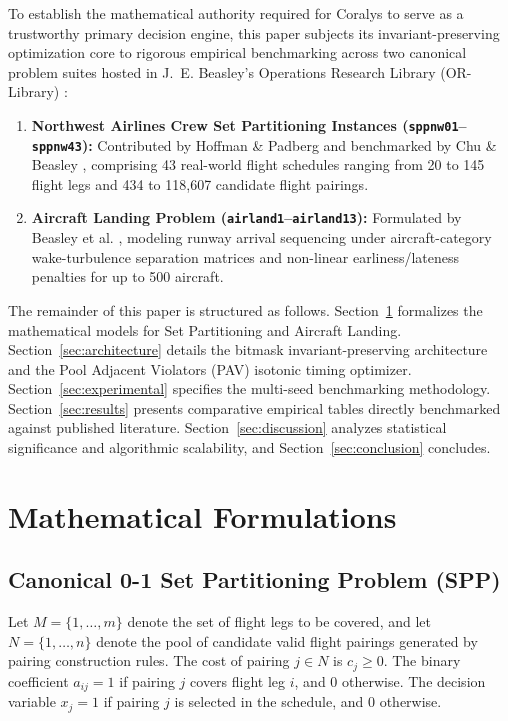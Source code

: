 \documentclass[10pt,journal,compsoc]{IEEEtran}
\begin{document}
To establish the mathematical authority required for Coralys to serve as a trustworthy primary decision engine, this paper subjects its invariant-preserving optimization core to rigorous empirical benchmarking across two canonical problem suites hosted in J.~E. Beasley's Operations Research Library (OR-Library) \cite{beasley1990orlib}:
\begin{enumerate}
    \item \textbf{Northwest Airlines Crew Set Partitioning Instances (\texttt{sppnw01}--\texttt{sppnw43}):} Contributed by Hoffman \& Padberg \cite{hoffman1993solving} and benchmarked by Chu \& Beasley \cite{chu1998constraint}, comprising 43 real-world flight schedules ranging from 20 to 145 flight legs and 434 to 118,607 candidate flight pairings.
    \item \textbf{Aircraft Landing Problem (\texttt{airland1}--\texttt{airland13}):} Formulated by Beasley et al. \cite{beasley2000scheduling}, modeling runway arrival sequencing under aircraft-category wake-turbulence separation matrices and non-linear earliness/lateness penalties for up to 500 aircraft.
\end{enumerate}

The remainder of this paper is structured as follows. Section~\ref{sec:formulations} formalizes the mathematical models for Set Partitioning and Aircraft Landing. Section~\ref{sec:architecture} details the bitmask invariant-preserving architecture and the Pool Adjacent Violators (PAV) isotonic timing optimizer. Section~\ref{sec:experimental} specifies the multi-seed benchmarking methodology. Section~\ref{sec:results} presents comparative empirical tables directly benchmarked against published literature. Section~\ref{sec:discussion} analyzes statistical significance and algorithmic scalability, and Section~\ref{sec:conclusion} concludes.

\section{Mathematical Formulations}
\label{sec:formulations}

\subsection{Canonical 0-1 Set Partitioning Problem (SPP)}
Let $M = \{1, \dots, m\}$ denote the set of flight legs to be covered, and let $N = \{1, \dots, n\}$ denote the pool of candidate valid flight pairings generated by pairing construction rules. The cost of pairing $j \in N$ is $c_j \ge 0$. The binary coefficient $a_{ij} = 1$ if pairing $j$ covers flight leg $i$, and $0$ otherwise. The decision variable $x_j = 1$ if pairing $j$ is selected in the schedule, and $0$ otherwise.
\end{document}
